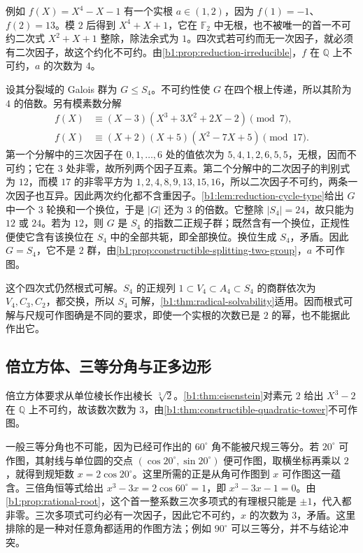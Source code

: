例如 \(f(X)=X^4-X-1\) 有一个实根 \(a\in(1,2)\)，因为 \(f(1)=-1\)、\(f(2)=13\)。模 \(2\) 后得到 \(X^4+X+1\)，它在 \(\mathbb F_2\) 中无根，也不被唯一的首一不可约二次式 \(X^2+X+1\) 整除，除法余式为 \(1\)。四次式若可约而无一次因子，就必须有二次因子，故这个约化不可约。由\cref{b1:prop:reduction-irreducible}，\(f\) 在 \(\mathbb Q\) 上不可约，\(a\) 的次数为 \(4\)。

\ProseParagraphBreak
设其分裂域的 Galois 群为 \(G\le S_4\)。不可约性使 \(G\) 在四个根上传递，所以其阶为 \(4\) 的倍数。另有模素数分解
\[
	\begin{aligned}
		f(X)&\equiv(X-3)(X^3+3X^2+2X-2)\pmod7,\\
		f(X)&\equiv(X+2)(X+5)(X^2-7X+5)\pmod{17}.
	\end{aligned}
\]
第一个分解中的三次因子在 \(0,1,\ldots,6\) 处的值依次为 \(5,4,1,2,6,5,5\)，无根，因而不可约；它在 \(3\) 处非零，故所列两个因子互素。第二个分解中的二次因子的判别式为 \(12\)，而模 \(17\) 的非零平方为 \(1,2,4,8,9,13,15,16\)，所以二次因子不可约，两条一次因子也互异。因此两次约化都不含重因子。\cref{b1:lem:reduction-cycle-type}给出 \(G\) 中一个 \(3\) 轮换和一个换位，于是 \(|G|\) 还为 \(3\) 的倍数。它整除 \(|S_4|=24\)，故只能为 \(12\) 或 \(24\)。若为 \(12\)，则 \(G\) 是 \(S_4\) 的指数二正规子群；既然含有一个换位，正规性便使它含有该换位在 \(S_4\) 中的全部共轭，即全部换位。换位生成 \(S_4\)，矛盾。因此 \(G=S_4\)，它不是 \(2\) 群，由\cref{b1:prop:constructible-splitting-two-group}，\(a\) 不可作图。

\ProseParagraphBreak
这个四次式仍然根式可解。\(S_4\) 的正规列 \(1\subset V_4\subset A_4\subset S_4\) 的商群依次为 \(V_4,C_3,C_2\)，都交换，所以 \(S_4\) 可解，\cref{b1:thm:radical-solvability}适用。因而根式可解与尺规可作图确是不同的要求，即使一个实根的次数已是 \(2\) 的幂，也不能据此作出它。

\subsection{倍立方体、三等分角与正多边形}
\label{b1:subsec:2104:02}

倍立方体要求从单位棱长作出棱长 \(\sqrt[3]{2}\)。\cref{b1:thm:eisenstein}对素元 \(2\) 给出 \(X^3-2\) 在 \(\mathbb Q\) 上不可约，故该数次数为 \(3\)，由\cref{b1:thm:constructible-quadratic-tower}不可作图。

\ProseParagraphBreak
一般三等分角也不可能，因为已经可作出的 \(60^\circ\) 角不能被尺规三等分。若 \(20^\circ\) 可作图，其射线与单位圆的交点 \((\cos20^\circ,\sin20^\circ)\) 便可作图，取横坐标再乘以 \(2\)，就得到规矩数 \(x=2\cos20^\circ\)。这里所需的正是从角可作图到 \(x\) 可作图这一蕴含。三倍角恒等式给出 \(x^3-3x=2\cos60^\circ=1\)，即 \(x^3-3x-1=0\)。由\cref{b1:prop:rational-root}，这个首一整系数三次多项式的有理根只能是 \(\pm1\)，代入都非零。三次多项式可约必有一次因子，因此它不可约，\(x\) 的次数为 \(3\)，矛盾。这里排除的是一种对任意角都适用的作图方法；例如 \(90^\circ\) 可以三等分，并不与结论冲突。

